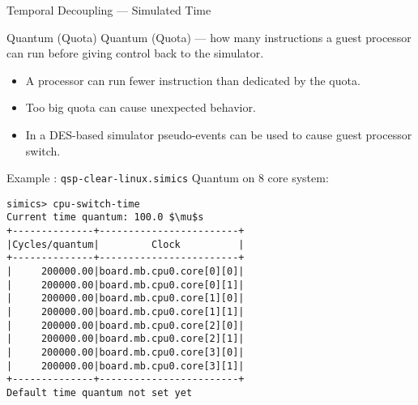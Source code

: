 \begin{frame}[fragile]{Temporal Decoupling --- Simulated Time}
\begin{center}
\end{center}
\end{frame}

\begin{frame}{Quantum (Quota)}
Quantum (Quota) --- how many instructions a guest processor can run before
giving control back to the simulator.
\vfill
\begin{itemize}
\item A processor can run fewer instruction than dedicated by the quota.
\item Too big quota can cause unexpected behavior.
\item In a DES-based simulator pseudo-events can be used to cause guest
 processor switch.
\end{itemize}
\end{frame}

\begin{frame}[fragile]{Example : \texttt{qsp-clear-linux.simics}}
Quantum on 8 core system:
\begin{lstlisting}[mathescape=true,keywordstyle=\ttfamily]
simics> cpu-switch-time
Current time quantum: 100.0 $\mu$s
+--------------+------------------------+
|Cycles/quantum|         Clock          |
+--------------+------------------------+
|     200000.00|board.mb.cpu0.core[0][0]|
|     200000.00|board.mb.cpu0.core[0][1]|
|     200000.00|board.mb.cpu0.core[1][0]|
|     200000.00|board.mb.cpu0.core[1][1]|
|     200000.00|board.mb.cpu0.core[2][0]|
|     200000.00|board.mb.cpu0.core[2][1]|
|     200000.00|board.mb.cpu0.core[3][0]|
|     200000.00|board.mb.cpu0.core[3][1]|
+--------------+------------------------+
Default time quantum not set yet
\end{lstlisting}
\end{frame}

